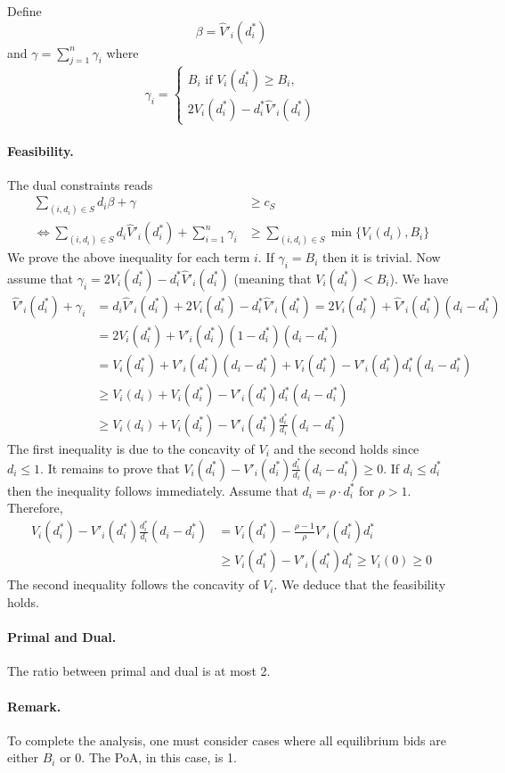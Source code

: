 \documentclass[11pt,a4paper]{article}
\begin{document}
Define 
$$
\beta = \hat{V}'_{i}(d^{*}_{i}) 
$$
and
$\gamma = \sum_{j=1}^{n} \gamma_{i}$
where
$$
\gamma_{i} = \begin{cases} 
			B_{i} \text{ if } V_{i}(d^{*}_{i}) \geq B_{i}, \\
			2 V_{i}(d^{*}_{i}) -   d^{*}_{i} \hat{V}'_{i}(d^{*}_{i})
			\end{cases}
$$

\paragraph{Feasibility.}
The dual constraints reads
\begin{align*}
\sum_{(i,d_{i}) \in S} d_{i} \beta + \gamma &\geq c_{S} \\
%
\Leftrightarrow 
\sum_{(i,d_{i}) \in S} d_{i} \hat{V}'_{i}(d^{*}_{i})  + \sum_{i=1}^{n} \gamma_{i} &\geq \sum_{(i,d_{i}) \in S} \min\{V_{i}(d_{i}), B_{i}\} 
\end{align*}
%
We prove the above inequality for each term $i$. If $\gamma_{i} = B_{i}$ then it is trivial. Now assume that 
$\gamma_{i} = 2 V_{i}(d^{*}_{i}) -   d^{*}_{i} \hat{V}'_{i}(d^{*}_{i})$ (meaning that $V_{i}(d^{*}_{i}) < B_{i}$). 
We have
%
\begin{align*}
\hat{V}'_{i}(d^{*}_{i})  + \gamma_{i}  
&= d_{i} \hat{V}'_{i}(d^{*}_{i})  + 2 V_{i}(d^{*}_{i}) -   d^{*}_{i} \hat{V}'_{i}(d^{*}_{i}) 
= 2 V_{i}(d^{*}_{i}) + \hat{V}'_{i}(d^{*}_{i}) (d_{i} - d^{*}_{i}) \\
%
&= 2 V_{i}(d^{*}_{i}) + V'_{i}(d^{*}_{i})(1 - d^{*}_{i}) (d_{i} - d^{*}_{i}) \\
%
&= V_{i}(d^{*}_{i}) + V'_{i}(d^{*}_{i})(d_{i} - d^{*}_{i}) + V_{i}(d^{*}_{i})  - V'_{i}(d^{*}_{i}) d^{*}_{i} (d_{i} - d^{*}_{i}) \\
%
&\geq V_{i}(d_{i}) + V_{i}(d^{*}_{i})  - V'_{i}(d^{*}_{i}) d^{*}_{i} (d_{i} - d^{*}_{i}) \\
%
&\geq V_{i}(d_{i}) + V_{i}(d^{*}_{i})  - V'_{i}(d^{*}_{i}) \frac{d^{*}_{i}}{d_{i}} (d_{i} - d^{*}_{i})
\end{align*}
The first inequality is due to the concavity of $V_{i}$ and the second holds since $d_{i} \leq 1$.
It remains to prove that $V_{i}(d^{*}_{i})  - V'_{i}(d^{*}_{i}) \frac{d^{*}_{i}}{d_{i}} (d_{i} - d^{*}_{i}) \geq 0$. 
If $d_{i} \leq d^{*}_{i}$ then the inequality follows immediately. Assume that $d_{i} = \rho \cdot d^{*}_{i}$ for $\rho > 1$. 
Therefore, 
\begin{align*}
V_{i}(d^{*}_{i})  - V'_{i}(d^{*}_{i}) \frac{d^{*}_{i}}{d_{i}} (d_{i} - d^{*}_{i}) 
&= V_{i}(d^{*}_{i})  - \frac{\rho - 1}{\rho} V'_{i}(d^{*}_{i}) d^{*}_{i} \\
%
&\geq V_{i}(d^{*}_{i})  - V'_{i}(d^{*}_{i}) d^{*}_{i} \geq V_{i}(0) \geq 0
\end{align*}
The second inequality follows the concavity of $V_{i}$. We deduce that the feasibility holds. 

\paragraph{Primal and Dual.}
The ratio between primal and dual is at most 2. 

\paragraph{Remark.} To complete the analysis, one must consider cases where all equilibrium bids are either $B_{i}$ or 0. The PoA, in this case, is 1.  
\end{document}
